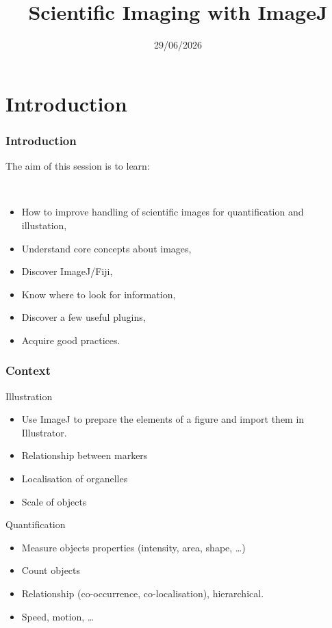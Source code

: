 \documentclass[ignorenonframetext,aspectratio=169,10pt,xcolor=table]{beamer}
\title{Scientific Imaging with ImageJ}
\date{29/06/2026}
\begin{document}
\begin{frame}
  \maketitle
\end{frame}

\section{Introduction}

\begin{frame} \frametitle<presentation>{Introduction}
  The aim of this session is to learn:

  ~~

  \begin{itemize}   \setlength\itemsep{1em}
    \item How to improve handling of scientific images for quantification and
          illustation,
    \item Understand core concepts about images,
    \item Discover ImageJ/Fiji,
    \item Know where to look for information,
    \item Discover a few useful plugins,
    \item Acquire good practices.
  \end{itemize}
\end{frame}


\begin{frame} \frametitle{Context}
  \begin{block}{Illustration}
    \begin{itemize}
      \item Use ImageJ to prepare the elements of a figure and import
            them in Illustrator.
      \item Relationship between markers
      \item Localisation of organelles
      \item Scale of objects
    \end{itemize}
    \begin{block}{Quantification}
      \begin{itemize}
        \item Measure objects properties (intensity, area, shape, \dots)
        \item Count objects
        \item Relationship (co-occurrence, co-localisation), hierarchical.
        \item Speed, motion, \dots
      \end{itemize}
    \end{block}
  \end{block}
\end{frame}
\end{document}
